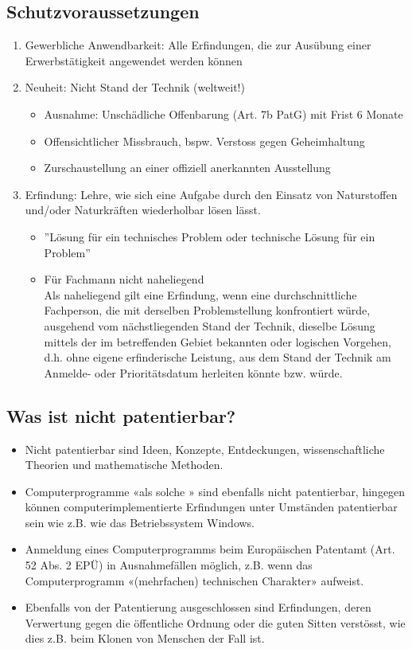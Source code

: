 \subsection{Schutzvoraussetzungen}

\begin{enumerate}
	\tightlist
	\item  Gewerbliche Anwendbarkeit: Alle Erfindungen, die zur Ausübung einer
	Erwerbstätigkeit angewendet werden können
	\item Neuheit: Nicht Stand der Technik (weltweit!)
	\begin{itemize}
		\tightlist
		\item Ausnahme: Unschädliche Offenbarung (Art. 7b PatG) mit Frist 6 Monate
		\item Offensichtlicher Missbrauch, bspw. Verstoss gegen Geheimhaltung
		\item Zurschaustellung an einer offiziell anerkannten Ausstellung
	\end{itemize}
	\item Erfindung: Lehre, wie sich eine Aufgabe durch den Einsatz von
	Naturstoffen und/oder Naturkräften wiederholbar lösen lässt.
	\begin{itemize}
		\tightlist
		\item ''Lösung für ein technisches Problem oder technische Lösung für ein
		Problem''
		\item Für Fachmann nicht naheliegend\\
		Als naheliegend gilt eine Erfindung, wenn eine durchschnittliche
		Fachperson, die mit derselben Problemstellung konfrontiert würde,
		ausgehend vom nächstliegenden Stand der Technik, dieselbe Lösung
		mittels der im betreffenden Gebiet bekannten oder logischen
		Vorgehen, d.h. ohne eigene erfinderische Leistung, aus dem Stand der
		Technik am Anmelde- oder Prioritätsdatum herleiten könnte bzw.
		würde.
	\end{itemize}
\end{enumerate}


\subsection{Was ist nicht patentierbar?}

\begin{itemize}
	\tightlist
	\item Nicht patentierbar sind Ideen, Konzepte, Entdeckungen,
	wissenschaftliche Theorien und mathematische Methoden.
	\item Computerprogramme «als solche » sind ebenfalls nicht patentierbar,
	hingegen können computerimplementierte Erfindungen unter Umständen
	patentierbar sein wie z.B. wie das Betriebssystem Windows.
	\item Anmeldung eines Computerprogramms beim Europäischen Patentamt (Art. 52
	Abs. 2 EPÜ) in Ausnahmefällen möglich, z.B. wenn das Computerprogramm
	«(mehrfachen) technischen Charakter» aufweist.
	\item Ebenfalls von der Patentierung ausgeschlossen sind Erfindungen, deren
	Verwertung gegen die öffentliche Ordnung oder die guten Sitten
	verstösst, wie dies z.B. beim Klonen von Menschen der Fall ist.
\end{itemize}


